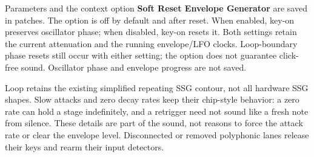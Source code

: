 Parameters and the context option \textbf{Soft Reset Envelope Generator}
are saved in patches. The option is off by default and after reset. When
enabled, key-on preserves oscillator phase; when disabled, key-on resets it.
Both settings retain the current attenuation and the running envelope/LFO
clocks. Loop-boundary phase resets still occur with either setting; the
option does not guarantee click-free sound. Oscillator phase and envelope
progress are not saved.

Loop retains the existing simplified repeating SSG contour, not all hardware
SSG shapes. Slow attacks and zero decay rates keep their chip-style behavior:
a zero rate can hold a stage indefinitely, and a retrigger need not sound like
a fresh note from silence. These details are part of the sound, not reasons
to force the attack rate or clear the envelope level. Disconnected or removed
polyphonic lanes release their keys and rearm their input detectors.
